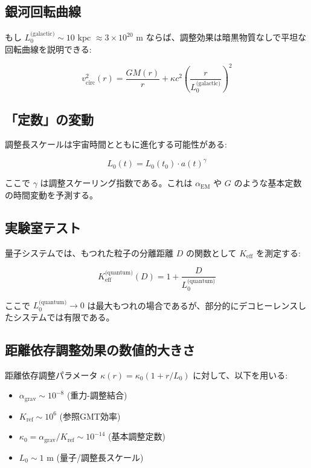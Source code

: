 \documentclass[11pt,a4paper]{article}
\begin{document}
	\subsection{銀河回転曲線}
	
	もし $L_0^{\text{(galactic)}} \sim 10$ kpc $\approx 3\times10^{20}$ m ならば、調整効果は暗黒物質なしで平坦な回転曲線を説明できる:
	
	\begin{equation}
		v_{\text{circ}}^2(r) = \frac{GM(r)}{r} + \kappa c^2 \left(\frac{r}{L_0^{\text{(galactic)}}}\right)^2
	\end{equation}
	
	\subsection{「定数」の変動}
	
	調整長スケールは宇宙時間とともに進化する可能性がある:
	
	\begin{equation}
		L_0(t) = L_0(t_0) \cdot a(t)^\gamma
	\end{equation}
	
	ここで $\gamma$ は調整スケーリング指数である。これは $\alpha_{\text{EM}}$ や $G$ のような基本定数の時間変動を予測する。
	
	\subsection{実験室テスト}
	
	量子システムでは、もつれた粒子の分離距離 $D$ の関数として $K_{\mathrm{eff}}$ を測定する:
	
	\begin{equation}
		K_{\mathrm{eff}}^{\text{(quantum)}}(D) = 1 + \frac{D}{L_0^{\text{(quantum)}}}
	\end{equation}
	
	ここで $L_0^{\text{(quantum)}} \to 0$ は最大もつれの場合であるが、部分的にデコヒーレンスしたシステムでは有限である。
	
	\subsection{距離依存調整効果の数値的大きさ}
	\label{subsec:numerical-magnitudes}
	
	距離依存調整パラメータ $\kappa(r) = \kappa_0(1 + r/L_0)$ に対して、以下を用いる:
	\begin{itemize}
		\item $\alpha_{\text{grav}} \sim 10^{-8}$ (重力-調整結合)
		\item $K_{\text{ref}} \sim 10^6$ (参照GMT効率)
		\item $\kappa_0 = \alpha_{\text{grav}}/K_{\text{ref}} \sim 10^{-14}$ (基本調整定数)
		\item $L_0 \sim 1$ m (量子/調整長スケール)
	\end{itemize}
	
\end{document}
